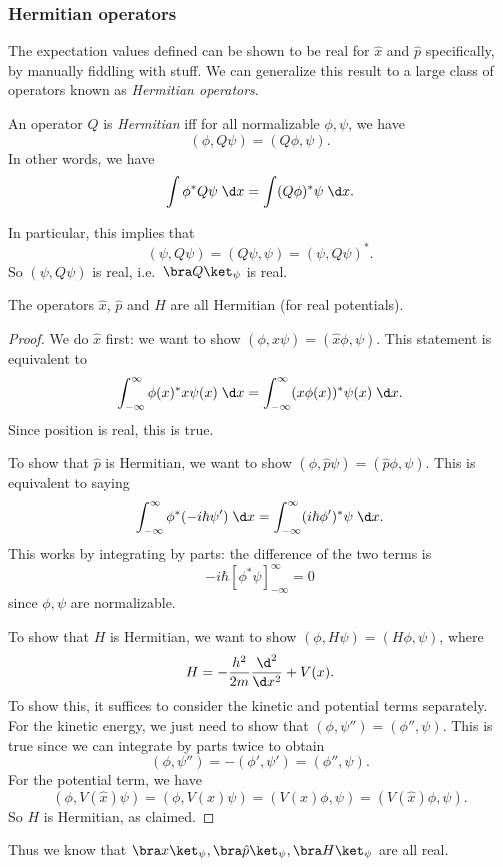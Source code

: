 \documentclass[a4paper]{article}
\begin{document}
\subsubsection*{Hermitian operators}
The expectation values defined can be shown to be real for $\hat{x}$ and $\hat{p}$ specifically, by manually fiddling with stuff. We can generalize this result to a large class of operators known as \emph{Hermitian operators}.
\begin{defi}
  An operator $Q$ is \emph{Hermitian} iff for all normalizable $\phi, \psi$, we have
  \[
    (\phi, Q\psi) = (Q\phi, \psi).
  \]
  In other words, we have
  \[
    \int \phi^* Q\psi \;\d x= \int(Q\phi)^* \psi \;\d x.
  \]
\end{defi}
In particular, this implies that
\[
  (\psi, Q\psi) = (Q\psi, \psi) = (\psi, Q\psi)^*.
\]
So $(\psi, Q\psi)$ is real, i.e.\ $\bra Q\ket_\psi$ is real.
\begin{prop}
  The operators $\hat{x}$, $\hat{p}$ and $H$ are all Hermitian (for real potentials).
\end{prop}

\begin{proof}
  We do $\hat{x}$ first: we want to show $(\phi, \hat{x} \psi) = (\hat{x}\phi, \psi)$. This statement is equivalent to
  \[
    \int_{-\infty}^\infty \phi(x)^* x\psi (x)\;\d x = \int_{-\infty}^\infty (x\phi(x))^* \psi(x)\;\d x.
  \]
  Since position is real, this is true.

  To show that $\hat{p}$ is Hermitian, we want to show $(\phi, \hat{p} \psi) = (\hat{p}\phi, \psi)$. This is equivalent to saying
  \[
    \int_{-\infty}^\infty \phi^*(-i\hbar \psi')\;\d x = \int_{-\infty}^\infty (i\hbar \phi')^*\psi \;\d x.
  \]
  This works by integrating by parts: the difference of the two terms is
  \[
    -i\hbar [\phi^*\psi]_{-\infty}^\infty = 0
  \]
  since $\phi, \psi$ are normalizable.

  To show that $H$ is Hermitian, we want to show $(\phi, H\psi) = (H\phi, \psi)$, where
  \[
    H = -\frac{h^2}{2m}\frac{\d^2}{\d x^2} + V(x).
  \]
  To show this, it suffices to consider the kinetic and potential terms separately. For the kinetic energy, we just need to show that $(\phi, \psi'') = (\phi'', \psi)$. This is true since we can integrate by parts twice to obtain
  \[
    (\phi, \psi'') = -(\phi', \psi') = (\phi'', \psi).
  \]
  For the potential term, we have
  \[
    (\phi, V(\hat{x})\psi) = (\phi, V(x) \psi) = (V(x)\phi, \psi) = (V(\hat{x})\phi, \psi).
  \]
  So $H$ is Hermitian, as claimed.
\end{proof}
Thus we know that $\bra x\ket_\psi, \bra \hat{p}\ket_\psi, \bra H\ket_\psi$ are all real.
\end{document}
